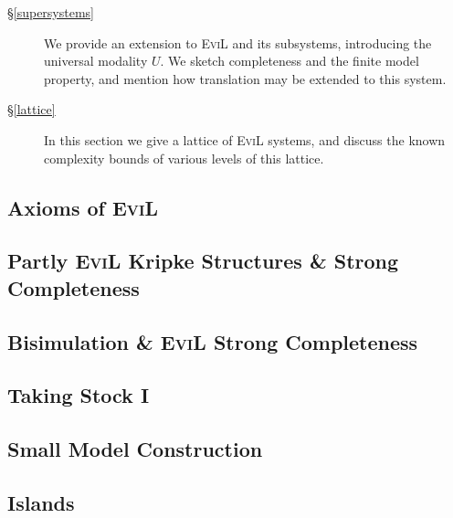 \begin{description}
  \item[\S\ref{supersystems}] We provide an extension to
    \textsc{EviL} and its subsystems, introducing the universal
    modality $U$. We sketch completeness and the finite model
    property, and mention how translation may be extended to this
    system.

 \item[\S\ref{lattice}]  In this section we give a lattice of
   \textsc{EviL} systems, and discuss the known complexity bounds of
   various levels of this lattice.
\end{description}

%

\subsection{Axioms of \textsc{EviL}}\label{evil-axioms}


\subsection{Partly \textsc{EviL} Kripke Structures \& Strong Completeness}\label{abstraction}\label{partly-evil-strong-soundness-and-completeness}


\subsection{Bisimulation \& \textsc{EviL} Strong Completeness}\label{completely-evil}\label{Abstract-Completeness}


\subsection{Taking Stock I}\label{taking-stock}


\subsection{Small Model Construction}\label{small-model}


\subsection{Islands}\label{islands}



